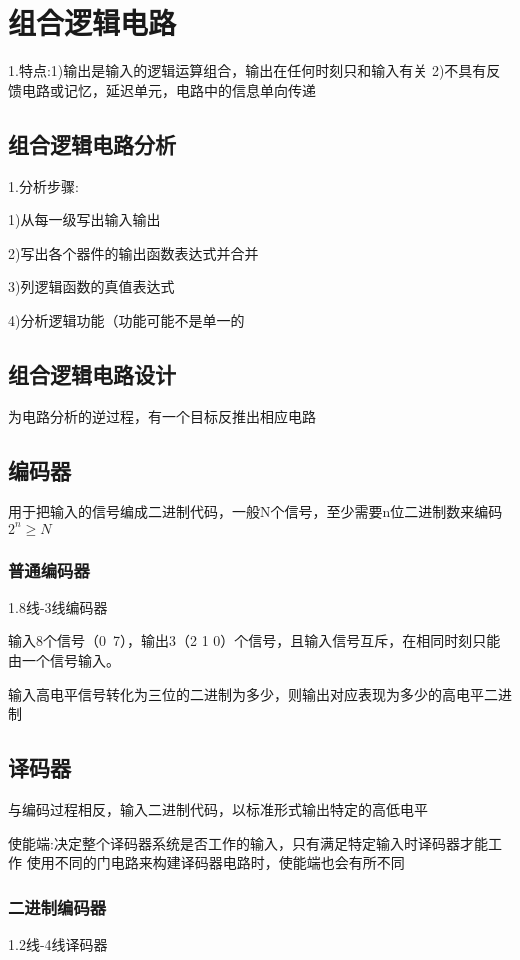 \documentclass[11pt,twoside,a4paper]{ctexart}
\begin{document}
    \section{组合逻辑电路}
    1.特点:1)输出是输入的逻辑运算组合，输出在任何时刻只和输入有关
    2)不具有反馈电路或记忆，延迟单元，电路中的信息单向传递
    \subsection{组合逻辑电路分析}
    1.分析步骤:
    \begin{minipage}[t]{0.9\linewidth}
        1)从每一级写出输入输出

        2)写出各个器件的输出函数表达式并合并

        3)列逻辑函数的真值表达式

        4)分析逻辑功能（功能可能不是单一的

    \end{minipage}
    \subsection{组合逻辑电路设计}
    为电路分析的逆过程，有一个目标反推出相应电路
    \subsection{编码器}
    用于把输入的信号编成二进制代码，一般N个信号，至少需要n位二进制数来编码
    $2^n \geq N$
    \subsubsection{普通编码器}
    1.8线-3线编码器

    输入8个信号（0~7），输出3（2 1 0）个信号，且输入信号互斥，在相同时刻只能由一个信号输入。

    输入高电平信号转化为三位的二进制为多少，则输出对应表现为多少的高电平二进制

    \subsection{译码器}
    与编码过程相反，输入二进制代码，以标准形式输出特定的高低电平

    使能端:决定整个译码器系统是否工作的输入，只有满足特定输入时译码器才能工作
    使用不同的门电路来构建译码器电路时，使能端也会有所不同
    \subsubsection{二进制编码器}
    1.2线-4线译码器
\end{document}
